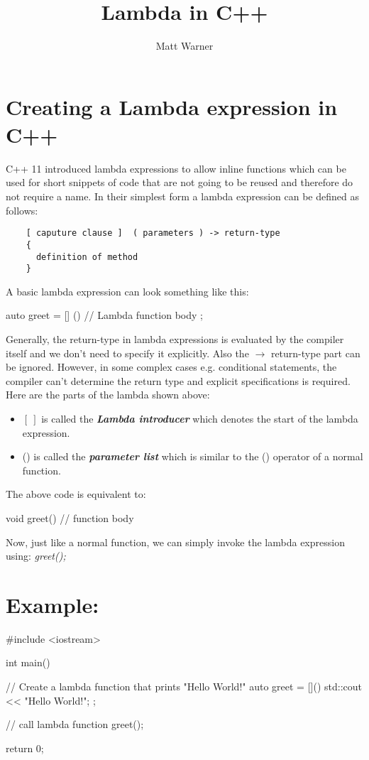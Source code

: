 \documentclass{report}
\title{\Huge{Lambda in C++}}
\author{\huge{Matt Warner}}
\date{\huge{}}
\begin{document}
	\maketitle
	\section{Creating a Lambda expression in C++} 
  C++ 11 introduced lambda expressions to allow inline functions which can be used for short snippets of code that are not going to be reused and therefore do not require a name. In their simplest form a lambda expression can be defined as follows:
  \begin{verbatim}
    [ caputure clause ]  ( parameters ) -> return-type
    {
      definition of method 
    }
  \end{verbatim}
  \bigbreak \noindent
  A basic lambda expression can look something like this:
  \begin{cppcode}
    auto greet = [] () {
      // Lambda function body
    };
  \end{cppcode}
  \bigbreak \noindent
  Generally, the return-type in lambda expressions is evaluated by the compiler itself and we don't need to specify it explicitly. Also the $\rightarrow$ return-type part can be ignored. However, in some complex cases e.g. conditional statements, the compiler can't determine the return type and explicit specifications is required.
\bigbreak \noindent
  Here are the parts of the lambda shown above:
  \begin{itemize}
    \item $[ \ ]$ is called the \textbf{\textit{Lambda introducer}} which denotes the start of the lambda expression.
    \item () is called the \textbf{\textit{parameter list}} which is similar to the () operator of a normal function.
  \end{itemize}
 \bigbreak \noindent \bigbreak \noindent
  The above code is equivalent to:
  \begin{cppcode}
    void greet() {
      // function body
    }
  \end{cppcode}
  \bigbreak \noindent Now, just like a normal function, we can simply invoke the lambda expression using:
  \textit{greet();}
  \section{Example:}
  \begin{cppcode}
   #include <iostream>
   
   int main() {

     // Create a lambda function that prints "Hello World!"
     auto greet = []() {
       std::cout << "Hello World!";
     };

     // call lambda function
     greet();

     return 0;
   }

  \end{cppcode}
\end{document}

